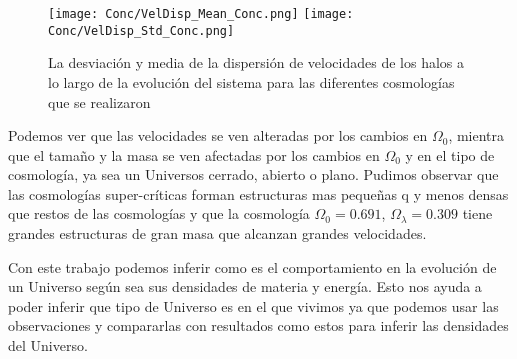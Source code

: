 \begin{figure}[H]
      \centering
      \texttt{[image: Conc/VelDisp\_Mean\_Conc.png]}
      \texttt{[image: Conc/VelDisp\_Std\_Conc.png]}
      \caption[Evolución de la desviación y media de la dispersión de velocidades los halos para todas las cosmologías]{La desviación y media de la dispersión de velocidades de los halos a lo largo de la evolución del sistema para las diferentes cosmologías que se realizaron}
      \label{fig:Conc_VelDisp}
\end{figure}

Podemos ver que las velocidades se ven alteradas por los cambios en $\Omega_0$, mientra que el tamaño y la masa se ven afectadas por los cambios en $\Omega_0$ y en el tipo de cosmología, ya sea un Universos cerrado, abierto o plano. Pudimos observar que las cosmologías super-críticas forman estructuras mas pequeñas q y menos densas que restos de las cosmologías y que la cosmología $\Omega_0 = 0.691$, $\Omega_\lambda = 0.309$ tiene grandes estructuras de gran masa que alcanzan grandes velocidades.

Con este trabajo podemos inferir como es el comportamiento en la evolución de un Universo según sea sus densidades de materia y energía. Esto nos ayuda a poder inferir que tipo de Universo es en el que vivimos ya que podemos usar las observaciones y compararlas con resultados como estos para inferir las densidades del Universo.
 

\lhead[\fancyplain{}{}]%
      {\fancyplain{}{\bfseries\rightmark}}
